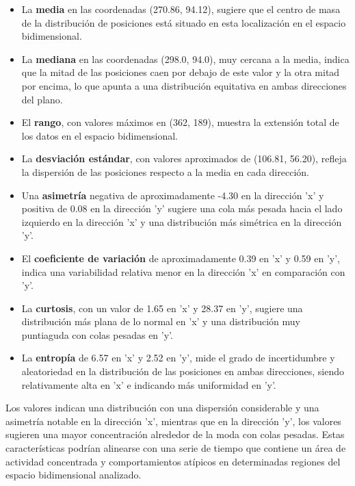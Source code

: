 \documentclass[11pt]{article} %
\begin{document}
	 \begin{itemize}
	 	\item La \textbf{media} en las coordenadas (270.86, 94.12), sugiere que el centro de masa de la distribución de posiciones está situado en esta localización en el espacio bidimensional.
	 	
	 	\item La \textbf{mediana} en las coordenadas (298.0, 94.0), muy cercana a la media, indica que la mitad de las posiciones caen por debajo de este valor y la otra mitad por encima, lo que apunta a una distribución equitativa en ambas direcciones del plano.
	 	
	
	 	\item El \textbf{rango}, con valores máximos en (362, 189), muestra la extensión total de los datos en el espacio bidimensional.
	 	
	 	\item La \textbf{desviación estándar}, con valores aproximados de (106.81, 56.20), refleja la dispersión de las posiciones respecto a la media en cada dirección.
	 	
	 	\item Una \textbf{asimetría} negativa de aproximadamente -4.30 en la dirección 'x' y positiva de 0.08 en la dirección 'y' sugiere una cola más pesada hacia el lado izquierdo en la dirección 'x' y una distribución más simétrica en la dirección 'y'.
	 	
	 	\item El \textbf{coeficiente de variación} de aproximadamente 0.39 en 'x' y 0.59 en 'y', indica una variabilidad relativa menor en la dirección 'x' en comparación con 'y'.
	 	
	 	\item La \textbf{curtosis}, con un valor de 1.65 en 'x' y 28.37 en 'y', sugiere una distribución más plana de lo normal en 'x' y una distribución muy puntiaguda con colas pesadas en 'y'.
	 	
	 	\item La \textbf{entropía} de 6.57 en 'x' y 2.52 en 'y', mide el grado de incertidumbre y aleatoriedad en la distribución de las posiciones en ambas direcciones, siendo relativamente alta en 'x' e indicando más uniformidad en 'y'.
	 \end{itemize}
	 
	 Los valores indican una distribución con una dispersión considerable y una asimetría notable en la dirección 'x', mientras que en la dirección 'y', los valores sugieren una mayor concentración alrededor de la moda con colas pesadas. Estas características podrían alinearse con una serie de tiempo que contiene un área de actividad concentrada y comportamientos atípicos en determinadas regiones del espacio bidimensional analizado.
	 
\end{document}
